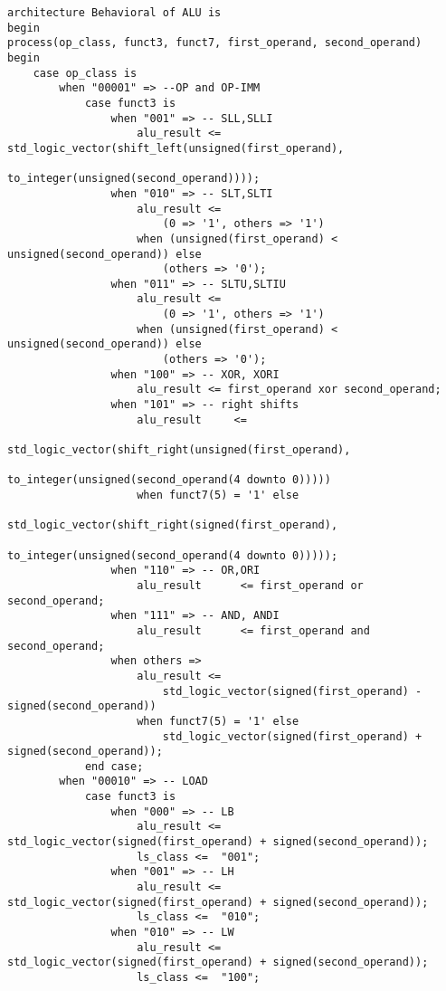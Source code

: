 \begin{code}
\begin{verbatim}
architecture Behavioral of ALU is
begin
process(op_class, funct3, funct7, first_operand, second_operand)
begin
    case op_class is
        when "00001" => --OP and OP-IMM
            case funct3 is
                when "001" => -- SLL,SLLI
                    alu_result <= std_logic_vector(shift_left(unsigned(first_operand),
                                        to_integer(unsigned(second_operand))));
                when "010" => -- SLT,SLTI
                    alu_result <= 
                        (0 => '1', others => '1')
                    when (unsigned(first_operand) < unsigned(second_operand)) else
                        (others => '0');
                when "011" => -- SLTU,SLTIU
                    alu_result <= 
                        (0 => '1', others => '1')
                    when (unsigned(first_operand) < unsigned(second_operand)) else
                        (others => '0');
                when "100" => -- XOR, XORI
                    alu_result <= first_operand xor second_operand;
                when "101" => -- right shifts
                    alu_result     <= 
                    std_logic_vector(shift_right(unsigned(first_operand), 
                                        to_integer(unsigned(second_operand(4 downto 0)))))
                    when funct7(5) = '1' else
                    std_logic_vector(shift_right(signed(first_operand), 
                                        to_integer(unsigned(second_operand(4 downto 0)))));
                when "110" => -- OR,ORI
                    alu_result      <= first_operand or second_operand;
                when "111" => -- AND, ANDI
                    alu_result      <= first_operand and second_operand;
                when others =>
                    alu_result <= 
                        std_logic_vector(signed(first_operand) - signed(second_operand))
                    when funct7(5) = '1' else
                        std_logic_vector(signed(first_operand) + signed(second_operand));
            end case;
        when "00010" => -- LOAD
            case funct3 is
                when "000" => -- LB
                    alu_result <= std_logic_vector(signed(first_operand) + signed(second_operand));
                    ls_class <=  "001";
                when "001" => -- LH
                    alu_result <= std_logic_vector(signed(first_operand) + signed(second_operand));
                    ls_class <=  "010";
                when "010" => -- LW
                    alu_result <= std_logic_vector(signed(first_operand) + signed(second_operand));
                    ls_class <=  "100";

\end{verbatim}
\end{code}
